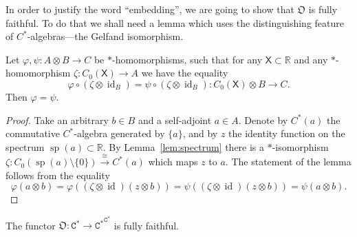 \documentclass[10pt]{simplearticle}
\newcommand{\id}{\operatorname{id}}
\newcommand{\Cstar}{\mathtt{C^{*}}}
\newcommand{\EFC}{\Cstar^{\Cstar}}
\newcommand{\spec}{\operatorname{sp}}
\begin{document}
In order to justify the word ``embedding'', we are going to show
that $\mathfrak{O}$ is fully faithful. To do that we shall need a
lemma which uses the distinguishing feature of $C^{*}$-algebras---the
Gelfand isomorphism.

\begin{lem}\label{lem:well-ppointed}
Let $\varphi,\psi\colon A\otimes B\to C$
be $*$-homomorphisms, such that for any $\mathsf{X}\subset\mathbb{R}$
and any $*$-homomorphism $\zeta\colon C_{0}(\mathsf{X})\to A$ we
have the equality
\[
\varphi\circ(\zeta\otimes\id_{B})=\psi\circ(\zeta\otimes\id_{B})\colon C_{0}(\mathsf{X})\otimes B\to C.
\]
Then $\varphi=\psi$.
\end{lem}

\begin{proof}
Take an arbitrary $b\in B$ and a self-adjoint $a\in A$. Denote by
$C^{*}(a)$ the commutative $C^{*}$-algebra generated by $\{a\}$,
and by $z$ the identity function on the spectrum $\spec(a)\subset\mathbb{R}$.
By Lemma~\ref{lem:spectrum} there is a $*$-isomorphism $\zeta\colon C_{0}(\spec(a)\setminus\{0\})\xrightarrow{\cong}C^{*}(a)$
which maps $z$ to $a$. The statement of the lemma follows from the
equality
\[
\varphi(a\otimes b)=\varphi((\zeta\otimes\id)(z\otimes b))=\psi((\zeta\otimes\id)(z\otimes b))=\psi(a\otimes b).
\]
\end{proof}

\begin{thm}\label{thm:O-ffaith}
The functor $\mathfrak{O}\colon\Cstar\to\EFC$
is fully faithful.
\end{thm}
\end{document}
